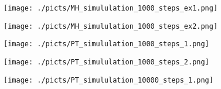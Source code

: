 \begin{frame}[plain]

	\begin{center}
		\begin{figure}\texttt{[image: ./picts/MH\_simululation\_1000\_steps\_ex1.png]}\end{figure}	
	\end{center}	
		
\end{frame}

\begin{frame}[plain]

	\begin{center}
		\begin{figure}\texttt{[image: ./picts/MH\_simululation\_1000\_steps\_ex2.png]}\end{figure}	
	\end{center}	
		
\end{frame}



\begin{frame}[plain]

	\begin{center}
		\begin{figure}\texttt{[image: ./picts/PT\_simululation\_1000\_steps\_1.png]}\end{figure}	
	\end{center}	
		
\end{frame}

\begin{frame}[plain]

	\begin{center}
		\begin{figure}\texttt{[image: ./picts/PT\_simululation\_1000\_steps\_2.png]}\end{figure}	
	\end{center}	
		
\end{frame}

\begin{frame}[plain]

	\begin{center}
		\begin{figure}\texttt{[image: ./picts/PT\_simululation\_10000\_steps\_1.png]}\end{figure}	
	\end{center}	
		
\end{frame}


